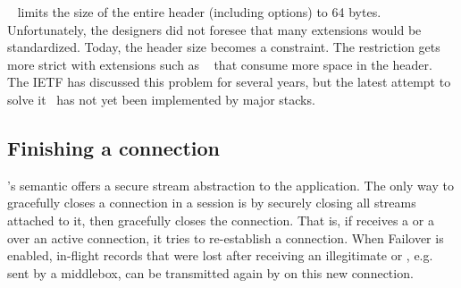 \tcp~\cite{rfc793} limits the size of the entire \tcp header (including options) to 64 bytes. Unfortunately, the \tcp designers did not foresee that many \tcp extensions would be standardized. Today, the \tcp header size becomes a constraint.
The restriction gets more strict with extensions such as \mptcp~\cite{rfc6824} that consume more space in the \tcp header. The IETF has discussed this problem for several years, but the latest attempt to solve it~\cite{draft-ietf-tcpm-tcp-edo-10} has not yet been implemented by major \tcp stacks.
%
%

\subsection{Finishing a \tcpls connection}
\tcpls's semantic offers a secure stream abstraction to the application.
The only way to gracefully closes a \tcp connection in a \tcpls session
is by securely closing all streams attached to it, then \tcpls gracefully closes the
\tcp connection. That is, if \tcpls receives a \rst or a \fin over an active
\tcp connection, it tries to re-establish a \tcp connection. 
When Failover is enabled, in-flight records that were lost after receiving 
an illegitimate \rst or \fin, e.g. sent by a middlebox, can be transmitted again by \tcpls
on this new \tcp connection.

